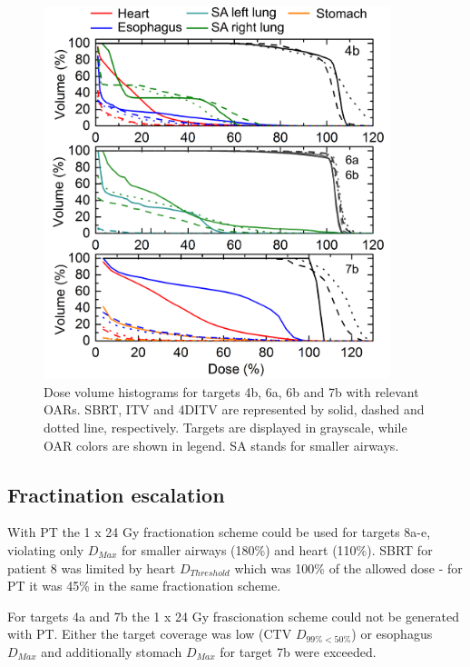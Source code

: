 \documentclass[type=dr, dr=rernat, accentcolor=tud7b,colorbacktitle, bigchapter, openright, twoside, 12pt ]{tudthesis}
\begin{document}
\newpage
\begin{figure}[H]
	\begin{center}
		\includegraphics[width=0.9\textwidth]{./Images/DVH_legend.png}
		\caption{Dose volume histograms for targets 4b, 6a, 6b and 7b with relevant OARs. SBRT, ITV and 4DITV are represented by solid, dashed and dotted line, respectively. Targets are displayed
		in grayscale, while OAR colors are shown in legend. SA stands for smaller airways.}
		\label{Fig:dvh}
	\end{center}
\end{figure}
\newpage


\subsection{Fractination escalation}

With PT the 1 x 24 Gy fractionation scheme could be used for targets 8a-e, violating only $D_{Max}$ for smaller airways (180\%) and heart (110\%). 
SBRT for patient 8 was limited by heart $D_{Threshold}$ which was 100\% of the allowed dose - for PT it was 45\% in the same fractionation scheme.

For targets 4a and 7b the 1 x 24 Gy frascionation scheme could not be generated with PT. Either the target coverage was low (CTV $D_{99\% < 50\%}$) or 
esophagus $D_{Max}$ and additionally stomach $D_{Max}$ for target 7b were exceeded.
\end{document}
